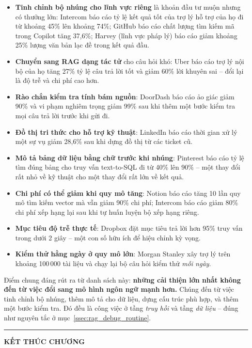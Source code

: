 \begin{itemize}
	\item \textbf{Tinh chỉnh bộ nhúng cho lĩnh vực riêng} là khoản đầu tư muộn nhưng có thưởng lớn: Intercom báo cáo tỷ lệ kết quả tốt của trợ lý hỗ trợ của họ đi từ khoảng 45\% lên khoảng 74\%; GitHub báo cáo chất lượng tìm kiếm mã trong Copilot tăng 37{,}6\%; Harvey (lĩnh vực pháp lý) báo cáo giảm khoảng 25\% lượng văn bản lạc đề trong kết quả đầu.
	\item \textbf{Chuyển sang RAG dạng tác tử} cho câu hỏi khó: Uber báo cáo trợ lý nội bộ của họ tăng 27\% tỷ lệ câu trả lời tốt và giảm 60\% lời khuyên sai -- đổi lại là độ trễ và chi phí cao hơn.
	\item \textbf{Rào chắn kiểm tra tính bám nguồn}: DoorDash báo cáo ảo giác giảm 90\% và vi phạm nghiêm trọng giảm 99\% sau khi thêm một bước kiểm tra mọi câu trả lời trước khi gửi đi.
	\item \textbf{Đồ thị tri thức cho hỗ trợ kỹ thuật}: LinkedIn báo cáo thời gian xử lý một sự vụ giảm 28{,}6\% sau khi dựng đồ thị từ các ticket cũ.
	\item \textbf{Mô tả bảng dữ liệu bằng chữ trước khi nhúng}: Pinterest báo cáo tỷ lệ tìm đúng bảng cho truy vấn text-to-SQL đi từ 40\% lên 90\% -- một thay đổi rất nhỏ về kỹ thuật cho một thay đổi rất lớn về kết quả.
	\item \textbf{Chi phí có thể giảm khi quy mô tăng}: Notion báo cáo tăng 10 lần quy mô tìm kiếm vector mà vẫn giảm 90\% chi phí; Intercom báo cáo giảm 80\% chi phí xếp hạng lại sau khi tự huấn luyện bộ xếp hạng riêng.
	\item \textbf{Mục tiêu độ trễ thực tế}: Dropbox đặt mục tiêu trả lời hơn 95\% truy vấn trong dưới 2 giây -- một con số hữu ích để hiệu chỉnh kỳ vọng.
	\item \textbf{Kiểm thử hằng ngày ở quy mô lớn}: Morgan Stanley xây trợ lý trên khoảng 100\,000 tài liệu và chạy lại bộ câu hỏi kiểm thử \emph{mỗi ngày}.
\end{itemize}

\noindent Điểm chung đáng rút ra từ danh sách này: \textbf{những cải thiện lớn nhất không đến từ việc đổi sang mô hình ngôn ngữ mạnh hơn.} Chúng đến từ việc tinh chỉnh bộ nhúng, thêm mô tả cho dữ liệu, dựng cấu trúc phù hợp, và thêm một bước kiểm tra. Đó đều là công việc ở tầng \emph{truy hồi} và tầng \emph{dữ liệu} -- đúng như nguyên tắc ở mục~\ref{ssec:rag_debug_routine}.

\bigskip
\hrule
\bigskip

\begin{center}
	\textbf{\Large KẾT THÚC CHƯƠNG \thechapter}
\end{center}

